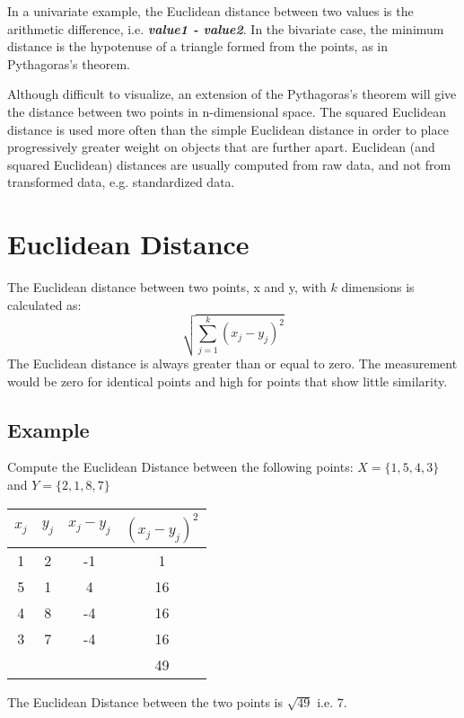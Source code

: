 In a univariate example, the Euclidean distance between two values is the arithmetic difference, i.e. \textbf{\textit{value1 - value2}}. In the bivariate case, the minimum distance is the hypotenuse of a triangle formed from the points, as in Pythagoras's theorem.

Although difficult to visualize, an extension of the Pythagoras's theorem will give the distance between two points in n-dimensional space. The squared Euclidean distance is used more often than the simple Euclidean distance in order to place progressively greater weight on objects that are further apart. Euclidean (and squared Euclidean) distances are usually computed from raw data, and not from transformed data, e.g. standardized data.
\newpage
\section{Euclidean Distance}
The Euclidean distance between two points, x and y, with $k$ dimensions is calculated as:
\[ \sqrt{ \sum^{k}_{j=1} ( x_j - y_j)^2 } \]
The Euclidean distance is always greater than or equal to zero. The measurement would be zero for identical points and high for points that show little similarity.
\subsection{Example}
Compute the Euclidean Distance between the following points:
$X = \{1,5,4,3\}$ and $Y = \{2,1,8,7\}$

\begin{center}
	\begin{tabular}{|c|c|c|c|}
		\hline
		$x_j$	&	$y_j$	&   $x_j - y_j$	&	$(x_j - y_j)^2$	\\ \hline
		1	&	2	&	-1	&	1	\\
		5	&	1	&	4	&	16	\\
		4	&	8	&	-4	&	16	\\
		3	&	7	&	-4	&	16	\\ \hline
		&		&		&	49	\\ \hline
	\end{tabular}
\end{center}
The Euclidean Distance between the two points is $\sqrt{49}$ i.e. 7.
